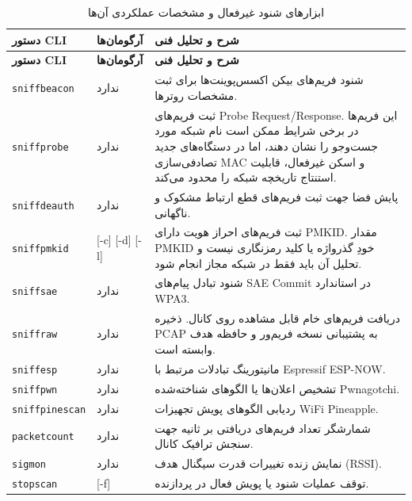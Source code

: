 \documentclass[11pt,a4paper]{article}
\newcommand{\lr}[1]{\foreignlanguage{english}{#1}}
\newcommand{\en}[1]{\lr{#1}}
\begin{document}
\begin{longtable}{llp{8cm}}
\caption{ابزارهای شنود غیرفعال و مشخصات عملکردی آن‌ها} \label{tab:sniffers} \\
\toprule
\textbf{دستور \en{CLI}} & \textbf{آرگومان‌ها} & \textbf{شرح و تحلیل فنی} \\
\midrule
\endfirsthead
\toprule
\textbf{دستور \en{CLI}} & \textbf{آرگومان‌ها} & \textbf{شرح و تحلیل فنی} \\
\midrule
\endhead
\bottomrule
\endfoot
\lr{\texttt{sniffbeacon}} & ندارد & شنود فریم‌های بیکن اکسس‌پوینت‌ها برای ثبت مشخصات روترها. \\
\lr{\texttt{sniffprobe}} & ندارد & ثبت فریم‌های \en{Probe Request/Response}. این فریم‌ها در برخی شرایط ممکن است نام شبکه مورد جست‌وجو را نشان دهند، اما در دستگاه‌های جدید تصادفی‌سازی MAC و اسکن غیرفعال، قابلیت استنتاج تاریخچه شبکه را محدود می‌کند. \\
\lr{\texttt{sniffdeauth}} & ندارد & پایش فضا جهت ثبت فریم‌های قطع ارتباط مشکوک و ناگهانی. \\
\lr{\texttt{sniffpmkid}} & \lr{[-c] [-d] [-l]} & ثبت فریم‌های احراز هویت دارای \en{PMKID}. مقدار \en{PMKID} خودِ گذرواژه یا کلید رمزنگاری نیست و تحلیل آن باید فقط در شبکه مجاز انجام شود. \\
\lr{\texttt{sniffsae}} & ندارد & شنود تبادل پیام‌های \en{SAE Commit} در استاندارد \en{WPA3}. \\
\lr{\texttt{sniffraw}} & ندارد & دریافت فریم‌های خام قابل مشاهده روی کانال. ذخیره \en{PCAP} به پشتیبانی نسخه فریم‌ور و حافظه هدف وابسته است. \\
\lr{\texttt{sniffesp}} & ندارد & مانیتورینگ تبادلات مرتبط با \en{Espressif ESP-NOW}. \\
\lr{\texttt{sniffpwn}} & ندارد & تشخیص اعلان‌ها یا الگوهای شناخته‌شده \en{Pwnagotchi}. \\
\lr{\texttt{sniffpinescan}} & ندارد & ردیابی الگوهای پویش تجهیزات \en{WiFi Pineapple}. \\
\lr{\texttt{packetcount}} & ندارد & شمارشگر تعداد فریم‌های دریافتی بر ثانیه جهت سنجش ترافیک کانال. \\
\lr{\texttt{sigmon}} & ندارد & نمایش زنده تغییرات قدرت سیگنال هدف \en{(RSSI)}. \\
\lr{\texttt{stopscan}} & \lr{[-f]} & توقف عملیات شنود یا پویش فعال در پردازنده. \\
\end{longtable}
\end{document}
